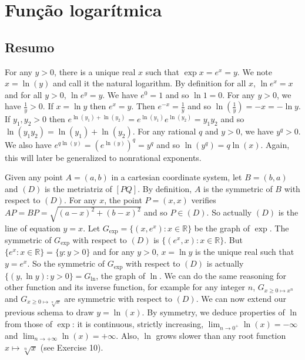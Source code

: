 \section{Função logarítmica}

\subsection*{Resumo}

For any $y > 0$, there is a unique real $x$ such that $\exp{x} = e^x = y$.
We note $x = \ln{(y)}$ and call it the natural logarithm.
By definition for all $x$,
$\ln e^x = x$ and for all $y > 0$, $\ln e^y = y$.
We have $e^0 = 1$ and so $\ln{1} = 0$.
For any $y > 0$, we have $\frac{1}{y} > 0$. If $x = \ln{y}$ then $e^{x} = y$.
Then $e^{-x} = \frac{1}{y}$ and so
${\ln\left(\frac{1}{y}\right)} = -x = -\ln{y}$.
If $y_1, y_2 > 0$ then $e^{\ln{(y_1)} + \ln{(y_2)}} =
e^{\ln{(y_1)}} e^{\ln{(y_2)}}
= y_1y_2$ and so $\ln{(y_1y_2)} = \ln{(y_1)} + \ln{(y_2)}$.
For any rational $q$ and $y > 0$, we have $y^q > 0$.
We also have $ e^{q \ln{(y)}} = {\left(e^{\ln{(y)}}\right)}^q = y^q$ and so
$\ln{(y^q)} = q \ln{(x)}$. Again, this will later be generalized to nonrational
exponents.

Given any point $A=(a,b)$ in a cartesian coordinate system, let $B=(b,a)$ and
$(D)$ is the metriatriz of $[PQ]$. By definition, $A$ is the symmetric of $B$
with respect to $(D)$. For any $x$, the point $P=(x,x)$ verifies
$AP = BP = \sqrt{{(a-x)}^2+{(b-x)}^2}$ and so $P \in (D)$. So actually $(D)$
is the line of equation $y = x$. Let
$G_{\exp} = {\{ {(x,e^x)} : x \in {\mathbb R} \}}$
be the graph of $\exp$. The symmetric of $G_{\exp}$ with respect to $(D)$ is
${\{ {(e^x,x)} : x \in {\mathbb R} \}}$. But
${\{ e^x : x \in {\mathbb R} \}} = {\{ y : y > 0 \}}$
and for any $y > 0$, $x=\ln{y}$ is the unique real such that $y = e^x$.
So the symmetric of $G_{\exp}$ with respect to $(D)$ is actually
${\{ {(y,\ln{y})} : y > 0 \}} = G_{\ln}$, the graph of $\ln$. We can do the same
reasoning for other function and its inverse function, for example
for any integer $n$, $G_{x \geq 0 \mapsto x^n}$ and $G_{x \geq 0 \mapsto \sqrt[n]{x}}$
are symmetric
with respect to $(D)$. We can now extend our previous schema to draw
$y=\ln(x)$. By symmetry, we deduce properties of $\ln$ from those of $\exp$:
it is
continuous, strictly increasing, $\lim_{n \rightarrow 0^+} \ln{(x)} = -\infty$
and $\lim_{n \rightarrow +\infty} \ln{(x)} = +\infty$.
Also, $\ln$ grows slower than
any root function $x \mapsto \sqrt[n]{x}$ (see Exercise 10).

